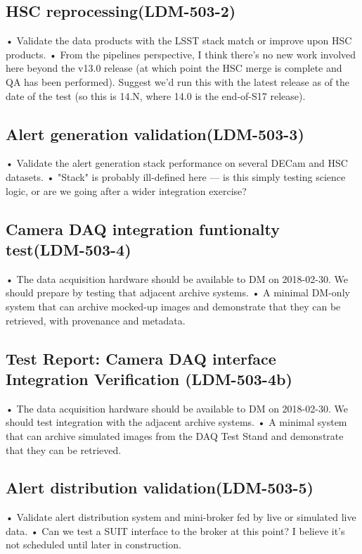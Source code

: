 \subsection{ HSC reprocessing\textbf{(LDM-503-2)}\label{LDM-503-2}}
• Validate the data products with the LSST stack match or improve upon HSC products.
 \newline• From the pipelines perspective, I think there's no new work involved here beyond the v13.0 release (at which point the HSC merge is complete and QA has been performed). Suggest we'd run this with the latest release as of the date of the test (so this is 14.N, where 14.0 is the end-of-S17 release).
\subsection{ Alert generation validation\textbf{(LDM-503-3)}\label{LDM-503-3}}
• Validate the alert generation stack performance on several DECam and HSC datasets.
 \newline• "Stack" is probably ill-defined here — is this simply testing science logic, or are we going after a wider integration exercise?
\subsection{ Camera DAQ integration funtionalty test\textbf{(LDM-503-4)}\label{LDM-503-4}}
• The data acquisition hardware should be available to DM on 2018-02-30. We should prepare by testing that adjacent archive systems.
 \newline• A minimal DM-only system that can archive mocked-up images and demonstrate that they can be retrieved, with provenance and metadata.
\subsection{Test Report: Camera DAQ interface Integration Verification \textbf{(LDM-503-4b)}\label{LDM-503-4b}}
• The data acquisition hardware should be available to DM on 2018-02-30. We should test integration with the adjacent archive systems.
 \newline• A minimal system that can archive simulated images from the DAQ Test Stand and demonstrate that they can be retrieved.
\subsection{ Alert distribution validation\textbf{(LDM-503-5)}\label{LDM-503-5}}
• Validate alert distribution system and mini-broker fed by live or simulated live data.
 \newline• Can we test a SUIT interface to the broker at this point? I believe it's not scheduled until later in construction.
